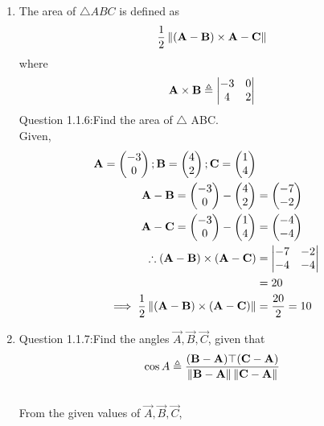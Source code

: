 \documentclass[11pt]{book}
\begin{document}
\begin{enumerate}[label=\thesection.\arabic*.,ref=\thesection.\theenumi]
\item The area of $\triangle ABC$ is defined as
		\begin{align}
			\frac{1}{2}\left\lVert{\ensuremath{\left(\mathbf{A}-\mathbf{B}\right)}\times {\mathbf{A}-\mathbf{C}}}\right\rVert
		\end{align}
		where
		\begin{align}
			\mathbf{A}\times\mathbf{B} \triangleq \begin{vmatrix}-3 & 0 \\4 & 2\end{vmatrix}
		\end{align}
Question 1.1.6:Find the area of $\triangle$ ABC.\\
\solution
Given,
\begin{align}
\mathbf{A} = \begin{pmatrix}-3\\0\end{pmatrix};
\mathbf{B} = \begin{pmatrix}4\\2\end{pmatrix};
\mathbf{C} = \begin{pmatrix}1\\4\end{pmatrix}\\
\mathbf{A}-\mathbf{B}=\begin{pmatrix}-3\\0\end{pmatrix}-\begin{pmatrix}4\\2\end{pmatrix}&=\begin{pmatrix}-7\\-2\end{pmatrix}\\
\mathbf{A}-\mathbf{C}=\begin{pmatrix}-3\\0\end{pmatrix}-\begin{pmatrix}1\\4\end{pmatrix}&=\begin{pmatrix}-4\\-4\end{pmatrix}\\
\therefore(\mathbf{A}-\mathbf{B})\times(\mathbf{A}-\mathbf{C}) &=\begin{vmatrix}-7 & -2\\-4 & -4\end{vmatrix}\\&=20\\
\implies\frac{1}{2}\left\lVert(\mathbf{A}-\mathbf{B})\times(\mathbf{A}-\mathbf{C})\right\rVert&=\frac{20}{2}=10
\end{align}


\item
Question 1.1.7:Find the angles $\vec{A},\vec{B},\vec{C}$, given that 
\begin{align}
	\cos{A} \triangleq \frac{(\mathbf{B}-\mathbf{A})\top(\mathbf{C}-\mathbf{A})}{\left\lVert\mathbf{B}-\mathbf{A}\right\rVert\left\lVert\mathbf{C}-\mathbf{A}\right\rVert}
\end{align}
\solution 
\\
From the given values of $\vec{A},\vec{B},\vec{C}$,\\
\begin{enumerate}


\end{enumerate}
\end{enumerate}
\end{document}
